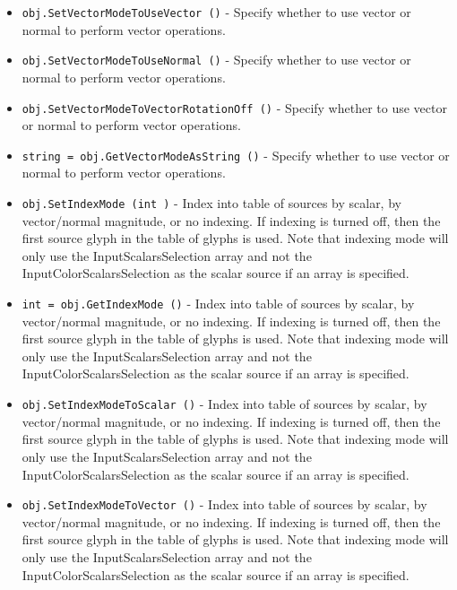 \begin{itemize}
\item  \verb|obj.SetVectorModeToUseVector ()| -  Specify whether to use vector or normal to perform vector operations.

\item  \verb|obj.SetVectorModeToUseNormal ()| -  Specify whether to use vector or normal to perform vector operations.

\item  \verb|obj.SetVectorModeToVectorRotationOff ()| -  Specify whether to use vector or normal to perform vector operations.

\item  \verb|string = obj.GetVectorModeAsString ()| -  Specify whether to use vector or normal to perform vector operations.

\item  \verb|obj.SetIndexMode (int )| -  Index into table of sources by scalar, by vector/normal magnitude, or
 no indexing. If indexing is turned off, then the first source glyph in
 the table of glyphs is used. Note that indexing mode will only use the
 InputScalarsSelection array and not the InputColorScalarsSelection
 as the scalar source if an array is specified.

\item  \verb|int = obj.GetIndexMode ()| -  Index into table of sources by scalar, by vector/normal magnitude, or
 no indexing. If indexing is turned off, then the first source glyph in
 the table of glyphs is used. Note that indexing mode will only use the
 InputScalarsSelection array and not the InputColorScalarsSelection
 as the scalar source if an array is specified.

\item  \verb|obj.SetIndexModeToScalar ()| -  Index into table of sources by scalar, by vector/normal magnitude, or
 no indexing. If indexing is turned off, then the first source glyph in
 the table of glyphs is used. Note that indexing mode will only use the
 InputScalarsSelection array and not the InputColorScalarsSelection
 as the scalar source if an array is specified.

\item  \verb|obj.SetIndexModeToVector ()| -  Index into table of sources by scalar, by vector/normal magnitude, or
 no indexing. If indexing is turned off, then the first source glyph in
 the table of glyphs is used. Note that indexing mode will only use the
 InputScalarsSelection array and not the InputColorScalarsSelection
 as the scalar source if an array is specified.


\end{itemize}
